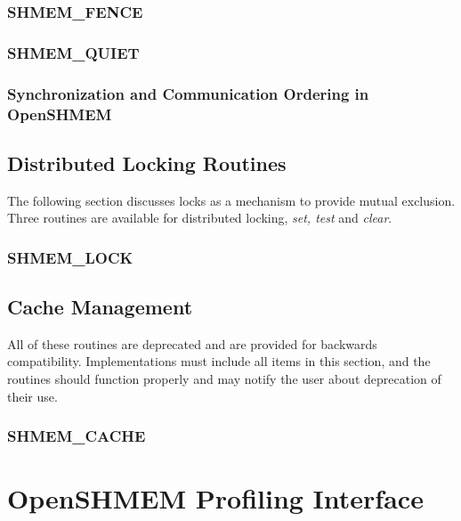\documentclass[10pt]{book}
\begin{document}
\subsubsection{\textbf{SHMEM\_FENCE}}\label{subsec:shmem_fence}


\subsubsection{\textbf{SHMEM\_QUIET}}\label{subsec:shmem_quiet}


\subsubsection{Synchronization and Communication Ordering in OpenSHMEM}







\subsection{Distributed Locking Routines}
The following section discusses \openshmem locks as a mechanism to provide
mutual exclusion. Three routines are available for distributed locking,
\textit{set, test} and \textit{clear}.

\subsubsection{\textbf{SHMEM\_LOCK}}\label{subsec:shmem_lock}






\subsection{Cache Management}
All of these routines are deprecated and are provided for backwards
compatibility.  Implementations must include all items in this section, and the
routines should function properly and may notify the user about deprecation of
their use.

\subsubsection{\textbf{SHMEM\_CACHE}}\label{subsec:shmem_cache}


\section{OpenSHMEM Profiling Interface}\label{sec:openshmem_profiling_interface}


\clearpage


\clearpage
{}
{}
\printindex
\end{document}
